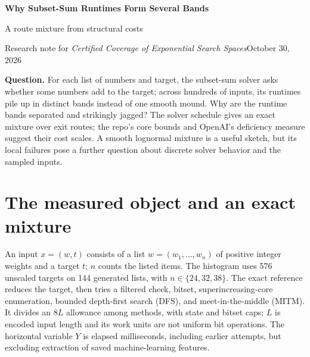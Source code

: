 \documentclass[10pt,english]{article}
\begin{document}
{\LARGE\sffamily\bfseries Why Subset-Sum Runtimes Form Several Bands}\par
\vspace{3pt}
{\large\sffamily A route mixture from structural costs}\par
\vspace{6pt}
{\small Research note for \emph{Certified Coverage of Exponential Search Spaces}\hfill October 30, 2026}\par

\begin{tcolorbox}[accentbox]
\textbf{Question.} For each list of numbers and target, the subset-sum solver asks whether some
numbers add to the target; across hundreds of inputs, its runtimes pile up in
distinct bands instead of one smooth mound.
Why are the runtime bands separated and strikingly jagged?
The solver schedule gives an exact mixture over exit routes; the repo's core
bounds and OpenAI's deficiency measure suggest their cost scales. A smooth
lognormal mixture is a useful sketch, but its local failures pose a further
question about discrete solver behavior and the sampled inputs.
\end{tcolorbox}

\section{The measured object and an exact mixture}
An input $x=(w,t)$ consists of a list $w=(w_1,\ldots,w_n)$ of positive integer
weights and a target $t$; $n$ counts the listed items. The
histogram uses 576 unscaled targets on 144 generated lists, with
$n\in\{24,32,38\}$. The exact reference reduces the target, then tries a
filtered check, bitset, superincreasing-core enumeration, bounded depth-first
search (DFS), and meet-in-the-middle (MITM). It divides an $8L$ allowance
among methods, with state and bitset caps; $L$ is encoded input length and its
work units are not uniform bit operations. The horizontal variable $Y$ is
elapsed milliseconds, including earlier attempts, but excluding extraction
of saved machine-learning features.
\end{document}
